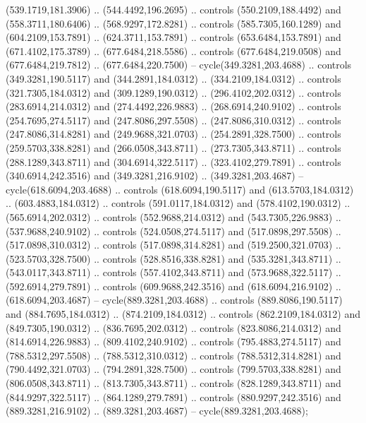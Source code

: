 {{\begin{scope}[y=-0.80pt,x=0.80pt,scale=0.038,xshift=-420pt,yshift=250pt]
        (539.1719,181.3906) .. (544.4492,196.2695) .. controls (550.2109,188.4492) and
        (558.3711,180.6406) .. (568.9297,172.8281) .. controls (585.7305,160.1289) and
        (604.2109,153.7891) .. (624.3711,153.7891) .. controls (653.6484,153.7891) and
        (671.4102,175.3789) .. (677.6484,218.5586) .. controls (677.6484,219.0508) and
        (677.6484,219.7812) .. (677.6484,220.7500) -- cycle(349.3281,203.4688) ..
        controls (349.3281,190.5117) and (344.2891,184.0312) .. (334.2109,184.0312) ..
        controls (321.7305,184.0312) and (309.1289,190.0312) .. (296.4102,202.0312) ..
        controls (283.6914,214.0312) and (274.4492,226.9883) .. (268.6914,240.9102) ..
        controls (254.7695,274.5117) and (247.8086,297.5508) .. (247.8086,310.0312) ..
        controls (247.8086,314.8281) and (249.9688,321.0703) .. (254.2891,328.7500) ..
        controls (259.5703,338.8281) and (266.0508,343.8711) .. (273.7305,343.8711) ..
        controls (288.1289,343.8711) and (304.6914,322.5117) .. (323.4102,279.7891) ..
        controls (340.6914,242.3516) and (349.3281,216.9102) .. (349.3281,203.4687) --
        cycle(618.6094,203.4688) .. controls (618.6094,190.5117) and
        (613.5703,184.0312) .. (603.4883,184.0312) .. controls (591.0117,184.0312) and
        (578.4102,190.0312) .. (565.6914,202.0312) .. controls (552.9688,214.0312) and
        (543.7305,226.9883) .. (537.9688,240.9102) .. controls (524.0508,274.5117) and
        (517.0898,297.5508) .. (517.0898,310.0312) .. controls (517.0898,314.8281) and
        (519.2500,321.0703) .. (523.5703,328.7500) .. controls (528.8516,338.8281) and
        (535.3281,343.8711) .. (543.0117,343.8711) .. controls (557.4102,343.8711) and
        (573.9688,322.5117) .. (592.6914,279.7891) .. controls (609.9688,242.3516) and
        (618.6094,216.9102) .. (618.6094,203.4687) -- cycle(889.3281,203.4688) ..
        controls (889.8086,190.5117) and (884.7695,184.0312) .. (874.2109,184.0312) ..
        controls (862.2109,184.0312) and (849.7305,190.0312) .. (836.7695,202.0312) ..
        controls (823.8086,214.0312) and (814.6914,226.9883) .. (809.4102,240.9102) ..
        controls (795.4883,274.5117) and (788.5312,297.5508) .. (788.5312,310.0312) ..
        controls (788.5312,314.8281) and (790.4492,321.0703) .. (794.2891,328.7500) ..
        controls (799.5703,338.8281) and (806.0508,343.8711) .. (813.7305,343.8711) ..
        controls (828.1289,343.8711) and (844.9297,322.5117) .. (864.1289,279.7891) ..
        controls (880.9297,242.3516) and (889.3281,216.9102) .. (889.3281,203.4687) --
        cycle(889.3281,203.4688);
    \end{scope}
  }
}
